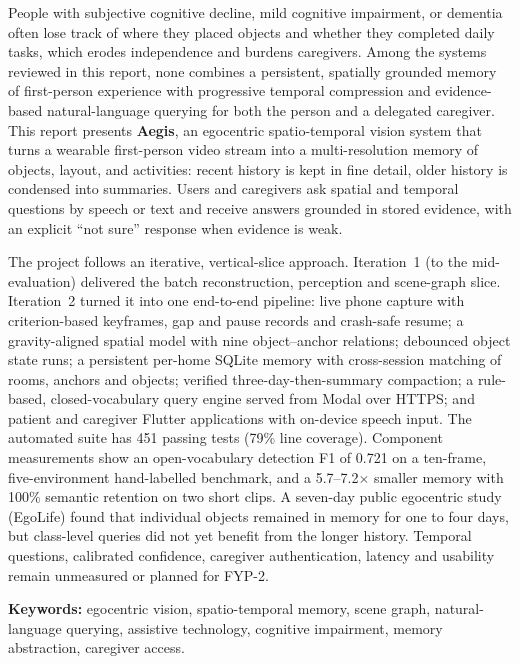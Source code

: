 People with subjective cognitive decline, mild cognitive impairment, or
dementia often lose track of where they placed objects and whether they
completed daily tasks, which erodes independence and burdens caregivers. Among
the systems reviewed in this report, none combines a persistent, spatially
grounded memory of first-person experience with progressive temporal
compression and evidence-based natural-language querying for both the person
and a delegated caregiver. This report presents \textbf{Aegis}, an egocentric
spatio-temporal vision system that turns a wearable first-person video stream
into a multi-resolution memory of objects, layout, and activities: recent
history is kept in fine detail, older history is condensed into summaries.
Users and caregivers ask spatial and temporal questions by speech or text and
receive answers grounded in stored evidence, with an explicit ``not sure''
response when evidence is weak.

The project follows an iterative, vertical-slice approach. Iteration~1 (to the
mid-evaluation) delivered the batch reconstruction, perception and scene-graph
slice. Iteration~2 turned it into one end-to-end pipeline: live phone capture
with criterion-based keyframes, gap and pause records and crash-safe resume; a
gravity-aligned spatial model with nine object--anchor relations; debounced
object state runs; a persistent per-home SQLite memory with cross-session
matching of rooms, anchors and objects; verified three-day-then-summary
compaction; a rule-based, closed-vocabulary query engine served from Modal over
HTTPS; and patient and caregiver Flutter applications with on-device speech
input. The automated suite has 451 passing tests (79\% line coverage).
Component measurements show an open-vocabulary detection F1 of 0.721 on a
ten-frame, five-environment hand-labelled benchmark, and a 5.7--7.2$\times$
smaller memory with 100\% semantic retention on two short clips. A seven-day
public egocentric study (EgoLife) found that individual objects remained in
memory for one to four days, but class-level queries did not yet benefit from
the longer history. Temporal questions, calibrated confidence, caregiver
authentication, latency and usability remain unmeasured or planned for FYP-2.

\medskip\noindent\textbf{Keywords:} egocentric vision, spatio-temporal memory,
scene graph, natural-language querying, assistive technology, cognitive
impairment, memory abstraction, caregiver access.
